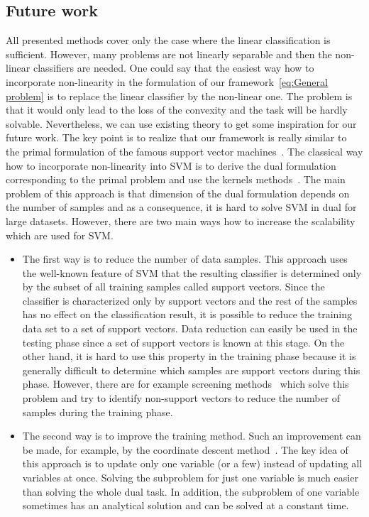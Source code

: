\documentclass[11pt,a4paper]{article}
\theoremstyle{definition}
\begin{document}
\subsection{Future work}

All presented methods cover only the case where the linear classification is sufficient. However, many problems are not linearly separable and then the non-linear classifiers are needed. One could say that the easiest way how to incorporate non-linearity in the formulation of our framework~\eqref{eq:General problem} is to replace the linear classifier by the non-linear one. The problem is that it would only lead to the loss of the convexity and the task will be hardly solvable. Nevertheless, we can use existing theory to get some inspiration for our future work. The key point is to realize that our framework is really similar to the primal formulation of the famous support vector machines~\cite{cortes1995support}. The classical way how to incorporate non-linearity into SVM is to derive the dual formulation~\cite{boyd2004convex} corresponding to the primal problem and use the kernels methods~\cite{scholkopf2001learning}. The main problem of this approach is that dimension of the dual formulation depends on the number of samples and as a consequence, it is hard to solve SVM in dual for large datasets. However, there are two main ways how to increase the scalability which are used for SVM.

\begin{itemize}
  \item The first way is to reduce the number of data samples. This approach uses the well-known feature of SVM that the resulting classifier is determined only by the subset of all training samples called support vectors. Since the classifier is characterized only by support vectors and the rest of the samples has no effect on the classification result, it is possible to reduce the training data set to a set of support vectors. Data reduction can easily be used in the testing phase since a set of support vectors is known at this stage. On the other hand, it is hard to use this property in the training phase because it is generally difficult to determine which samples are support vectors during this phase. However, there are for example screening methods~\cite{ogawa2013safe,wang2014scaling} which solve this problem and try to identify non-support vectors to reduce the number of samples during the training phase.

  \item The second way is to improve the training method. Such an improvement can be made, for example, by the coordinate descent method~\cite{chang2008coordinate,hsieh2008dual}. The key idea of this approach is to update only one variable (or a few) instead of updating all variables at once. Solving the subproblem for just one variable is much easier than solving the whole dual task. In addition, the subproblem of one variable sometimes has an analytical solution and can be solved at a constant time.
\end{itemize}
\end{document}
